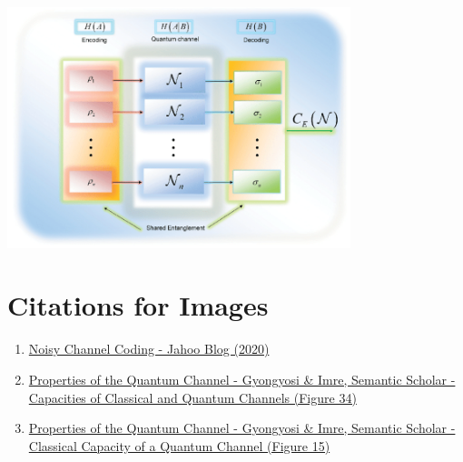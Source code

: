 \begin{center}
    \includegraphics[width=0.75\textwidth]{figures/classical_cap.png}
\end{center}
\section{Citations for Images}

\begin{enumerate}
    \item \href{https://jahoo.github.io/2020/12/16/noisy-channel-coding.html}{Noisy Channel Coding - Jahoo Blog (2020)}
    \item \href{https://www.semanticscholar.org/paper/Properties-of-the-Quantum-Channel-Gyongyosi-Imre/0b473e0d1d4041ee6663691b5a96e8d6a5c82ba6/figure/34}{Properties of the Quantum Channel - Gyongyosi \& Imre, Semantic Scholar - Capacities of Classical and Quantum Channels (Figure 34)}

    \item \href{https://www.semanticscholar.org/paper/Properties-of-the-Quantum-Channel-Gyongyosi-Imre/0b473e0d1d4041ee6663691b5a96e8d6a5c82ba6/figure/15}{Properties of the Quantum Channel - Gyongyosi \& Imre, Semantic Scholar - Classical Capacity of a Quantum Channel (Figure 15)}
\end{enumerate}

